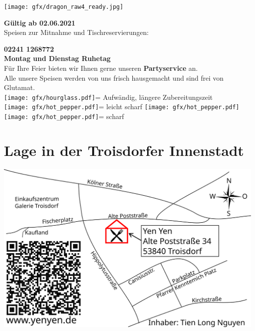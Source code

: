 \documentclass[a4paper,10pt,notumble]{leaflet}
\newcommand{\slow}{\texttt{[image: gfx/hourglass.pdf]}\xspace}
\newcommand{\hotpepper}{\texttt{[image: gfx/hot\_pepper.pdf]}\xspace}
\begin{document}
 
\RaggedRight
{}

\begin{center}
\texttt{[image: gfx/dragon\_raw4\_ready.jpg]}%

\textbf{{\small Gültig ab 02.06.2021}}\\[2mm]
Speisen zur Mitnahme und Tischreservierungen: 

\textbf{02241 1268772}\\[1mm]
\vfill
\textbf{Montag und Dienstag Ruhetag}\\[4mm]
Für Ihre Feier bieten wir Ihnen gerne unseren \textbf{Partyservice} an.\\[2mm]
Alle unsere Speisen werden von uns frisch hausgemacht und sind frei von Glutamat.\\[2mm]
\slow = Aufwändig, längere Zubereitungszeit\\
\hotpepper = leicht scharf \quad \quad \hotpepper\hotpepper = scharf
\end{center}%
\vfill
\section*{Lage in der Troisdorfer Innenstadt}
\begin{center}
	\includegraphics[width=1.0\textwidth]{gfx/map/tdfcity}
\end{center}
\end{document}
